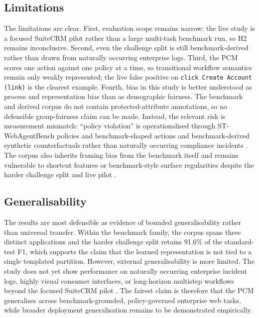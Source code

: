 \documentclass[12pt,a4paper]{article}
\begin{document}
\subsection{Limitations}

The limitations are clear. First, evaluation scope remains narrow: the live
study is a focused SuiteCRM pilot rather than a large multi-task benchmark run,
so H2 remains inconclusive. Second, even the challenge split is still
benchmark-derived rather than drawn from naturally occurring enterprise logs.
Third, the PCM scores one action against one policy at a time, so transitional
workflow semantics remain only weakly represented; the live false positive on
\texttt{click Create Account (link)} is the clearest example. Fourth, bias in
this study is better understood as process and representation bias than as
demographic fairness. The benchmark and derived corpus do not contain
protected-attribute annotations, so no defensible group-fairness claim can be
made. Instead, the relevant risk is measurement mismatch: ``policy violation''
is operationalised through ST-WebAgentBench policies and benchmark-shaped
actions and benchmark-derived synthetic counterfactuals rather than naturally
occurring compliance incidents
\citep{jacobs2021measurement}. The corpus also inherits framing bias from the
benchmark itself and remains vulnerable to shortcut features or benchmark-style
surface regularities despite the harder challenge split and live pilot
\citep{suresh2021harm,li2023synthetic,geirhos2020shortcut}.

\subsection{Generalisability}

The results are most defensible as evidence of bounded generalisability rather
than universal transfer. Within the benchmark family, the corpus spans three
distinct applications and the harder challenge split retains 91.6\% of the
standard-test F1, which supports the claim that the learned representation is
not tied to a single templated partition. However, external generalisability is
more limited. The study does not yet show performance on naturally occurring
enterprise incident logs, highly visual consumer interfaces, or long-horizon
multistep workflows beyond the focused SuiteCRM pilot
\citep{zhou2024webarena,koh2024visualwebarena,xue2025illusion}. The fairest
claim is therefore that the PCM generalises across benchmark-grounded,
policy-governed enterprise web tasks, while broader deployment generalisation
remains to be demonstrated empirically.
\end{document}
